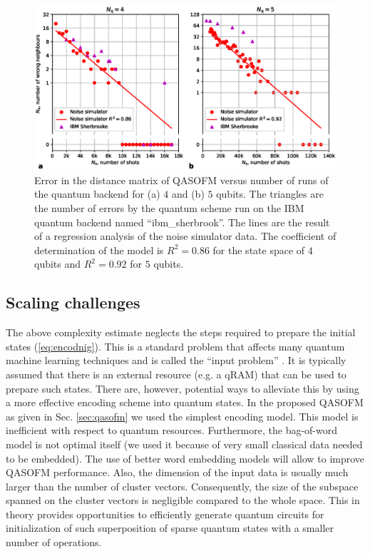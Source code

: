 \documentclass[%
  pra, aps, physrev,
  showkeys,
  twocolumn,
  showpacs,
  superscriptaddress,
  amsmath,amssymb,
  10pt
]{revtex4-2}
\begin{document}
\begin{figure}[t]
  \includegraphics[width=1.85\columnwidth]{tomography-errors-by-shots-n4-n5.eps}
  \caption{Error in the distance matrix of QASOFM versus number of runs of the quantum backend for (a) $4$ and (b) $5$ qubits. The triangles are the number of errors by the quantum scheme run on the IBM quantum backend named ``ibm\_sherbrook''.  The lines are the result of a regression analysis of the noise simulator data.  The coefficient of determination of the model is $R^2 = 0.86$ for the state space of $4$ qubits and $R^2 = 0.92$ for $5$ qubits.
  }   \label{fig:tomography-errors-by-shots-n4}
\end{figure}





\subsection{Scaling challenges}

The above complexity estimate neglects the steps required to prepare the initial states (\ref{eq:encodnig}).  This is a standard problem that affects many quantum machine learning techniques and is called the ``input problem'' \cite{biamonte2017}.  It is typically assumed that there is an external resource (e.g. a qRAM) that can be used to prepare such states.  There are, however, potential ways to alleviate this by using a more effective encoding scheme into quantum states.  In the proposed QASOFM as given in Sec. \ref{sec:qasofm} we used the simplest encoding model. This model is inefficient with respect to quantum resources. Furthermore, the bag-of-word model is not optimal itself (we used it because of very small classical data needed to be embedded). The use of better word embedding models will allow to improve QASOFM performance. Also, the dimension of the input data is usually much larger than the number of cluster vectors. Consequently, the size of the subspace spanned on the cluster vectors is negligible compared to the whole space. This in theory provides opportunities to efficiently generate quantum circuits for initialization of such superposition of sparse quantum states with a smaller number of operations.
\end{document}
